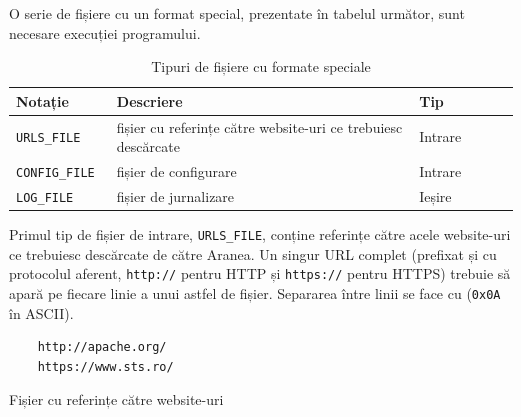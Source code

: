 \documentclass[12pt]{article}
\begin{document}
O serie de fișiere cu un format special, prezentate în tabelul următor, sunt necesare execuției programului.

\begin{table}[H]
    \centering
    \begin{tabular}{ |p{0.2\linewidth} | p{0.6\linewidth}| p{0.2\linewidth}| } 
        \hline
        Notație & Descriere & Tip \\
        \hline
        \texttt{URLS_FILE} & fișier cu referințe către website-uri ce trebuiesc descărcate & Intrare \\
        \texttt{CONFIG_FILE} & fișier de configurare & Intrare \\
        \texttt{LOG_FILE} & fișier de jurnalizare & Ieșire \\
        \hline
    \end{tabular}
    \caption{Tipuri de fișiere cu formate speciale}
    \label{table:1}
\end{table}

Primul tip de fișier de intrare, \texttt{URLS_FILE}, conține referințe către acele website-uri ce trebuiesc descărcate de către Aranea. Un singur URL complet (prefixat și cu protocolul aferent, \texttt{http://} pentru HTTP și \texttt{https://} pentru HTTPS) trebuie să apară pe fiecare linie a unui astfel de fișier. Separarea între linii se face cu \texttt{\n} (\texttt{0x0A} în ASCII).

\begin{listing}[ht]
    \begin{verbatim}
    http://apache.org/
    https://www.sts.ro/
    \end{verbatim}
    \caption{Fișier cu referințe către website-uri}
    \label{listing:1}
\end{listing}
\end{document}
